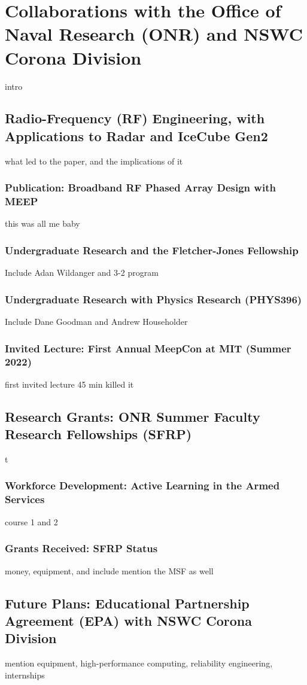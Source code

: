 \documentclass[../../../main.tex]{subfiles}
\begin{document}
\section{Collaborations with the Office of Naval Research (ONR) and NSWC Corona Division}
\label{sec:naval_research}
intro
\subsection{Radio-Frequency (RF) Engineering, with Applications to Radar and IceCube Gen2}
what led to the paper, and the implications of it
\subsubsection{Publication: Broadband RF Phased Array Design with MEEP}
this was all me baby
\subsubsection{Undergraduate Research and the Fletcher-Jones Fellowship}
Include Adan Wildanger and 3-2 program
\subsubsection{Undergraduate Research with Physics Research (PHYS396)}
Include Dane Goodman and Andrew Householder
\subsubsection{Invited Lecture: First Annual MeepCon at MIT (Summer 2022)}
first invited lecture 45 min killed it
\subsection{Research Grants: ONR Summer Faculty Research Fellowships (SFRP)}
t
\subsubsection{Workforce Development: Active Learning in the Armed Services}
course 1 and 2
\subsubsection{Grants Received: SFRP Status}
money, equipment, and include mention the MSF as well
\subsection{Future Plans: Educational Partnership Agreement (EPA) with NSWC Corona Division}
mention equipment, high-performance computing, reliability engineering, internships
\end{document}
